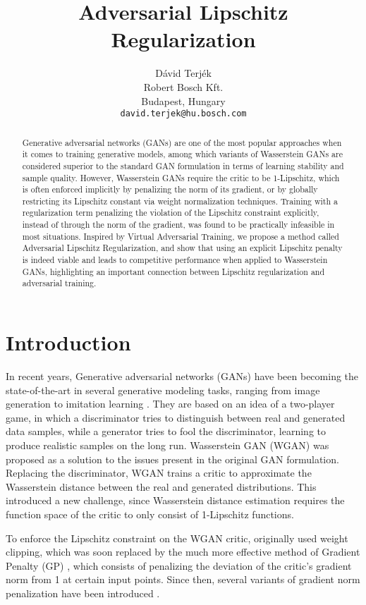 \documentclass{article}
\title{Adversarial Lipschitz Regularization}
\author{D\'avid Terj\'ek \\
  Robert Bosch Kft. \\
  Budapest, Hungary \\
  \texttt{david.terjek@hu.bosch.com} \\
}
\begin{document}
\maketitle

\begin{abstract}
Generative adversarial networks (GANs) are one of the most popular approaches when it comes to training generative models, among which variants of Wasserstein GANs are considered superior to the standard GAN formulation in terms of learning stability and sample quality. However, Wasserstein GANs require the critic to be 1-Lipschitz, which is often enforced implicitly by penalizing the norm of its gradient, or by globally restricting its Lipschitz constant via weight normalization techniques. Training with a regularization term penalizing the violation of the Lipschitz constraint explicitly, instead of through the norm of the gradient, was found to be practically infeasible in most situations. Inspired by Virtual Adversarial Training, we propose a method called Adversarial Lipschitz Regularization, and show that using an explicit Lipschitz penalty is indeed viable and leads to competitive performance when applied to Wasserstein GANs, highlighting an important connection between Lipschitz regularization and adversarial training.
\end{abstract}

\section{Introduction}
\label{intro}
In recent years, Generative adversarial networks (GANs) \citep{Goodfellowetal2014a} have been becoming the state-of-the-art in several generative modeling tasks, ranging from image generation \citep{Karrasetal2017} to imitation learning \citep{Hoetal2016}. They are based on an idea of a two-player game, in which a discriminator tries to distinguish between real and generated data samples, while a generator tries to fool the discriminator, learning to produce realistic samples on the long run. Wasserstein GAN (WGAN) was proposed as a solution to the issues present in the original GAN formulation. Replacing the discriminator, WGAN trains a critic to approximate the Wasserstein distance between the real and generated distributions. This introduced a new challenge, since Wasserstein distance estimation requires the function space of the critic to only consist of 1-Lipschitz functions.

To enforce the Lipschitz constraint on the WGAN critic, \citet{Arjovskyetal2017} originally used weight clipping, which was soon replaced by the much more effective method of Gradient Penalty (GP) \citep{Gulrajanietal2017}, which consists of penalizing the deviation of the critic's gradient norm from 1 at certain input points. Since then, several variants of gradient norm penalization have been introduced \citep{Petzkaetal2018, Weietal2018, Adleretal2018, Zhouetal2019a}.
\end{document}
